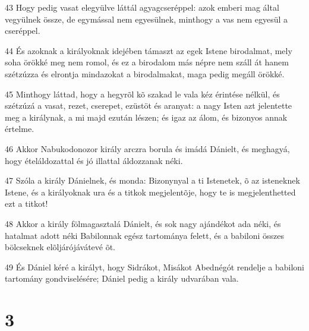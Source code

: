 \par 43 Hogy pedig vasat elegyülve láttál agyagcseréppel: azok emberi mag által vegyülnek össze, de egymással nem egyesülnek, minthogy a vas nem egyesül a cseréppel.
\par 44 És azoknak a királyoknak idejében támaszt az egek Istene birodalmat, mely soha örökké meg nem romol, és ez a birodalom más népre nem száll át hanem szétzúzza és elrontja mindazokat a birodalmakat, maga pedig megáll örökké.
\par 45 Minthogy láttad, hogy a hegyrõl kõ szakad le vala kéz érintése nélkül, és szétzúzá a vasat, rezet, cserepet, ezüstöt és aranyat: a nagy Isten azt jelentette meg a királynak, a mi majd ezután lészen; és igaz az álom, és bizonyos annak értelme.
\par 46 Akkor Nabukodonozor király arczra borula és imádá Dánielt, és meghagyá, hogy ételáldozattal és jó illattal áldozzanak néki.
\par 47 Szóla a király Dánielnek, és monda: Bizonynyal a ti Istenetek, õ az isteneknek Istene, és a királyoknak ura és a titkok megjelentõje, hogy te is megjelenthetted ezt a titkot!
\par 48 Akkor a király fölmagasztalá Dánielt, és sok nagy ajándékot ada néki, és hatalmat adott néki Babilonnak egész tartománya felett, és a babiloni összes bölcseknek elõljárójávátevé õt.
\par 49 És Dániel kéré a királyt, hogy Sidrákot, Misákot Abednégót rendelje a babiloni tartomány gondviselésére; Dániel pedig a király udvarában vala.

\chapter{3}

